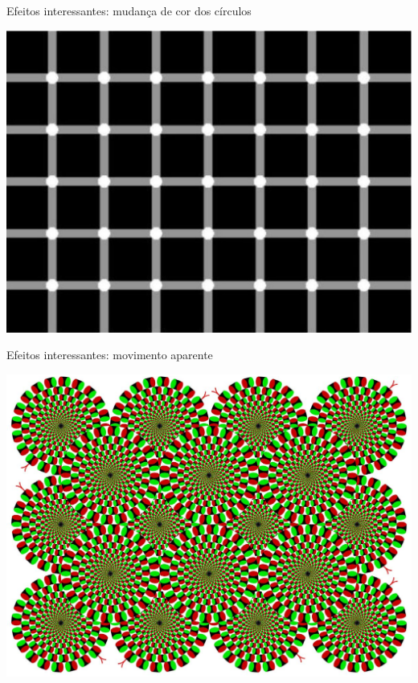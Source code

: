       \begin{slide}[toc=]{Efeitos interessantes: mudança de cor dos círculos}
            \begin{center}
               \includegraphics[height=0.8\textheight]{figs/2153774.eps}
            \end{center}
      \end{slide}
      \begin{slide}[toc=]{Efeitos interessantes: movimento aparente}
            \begin{center}
               \includegraphics[height=0.8\textheight]{figs/2004071401_rotsnake7.eps}
            \end{center}
      \end{slide}
      
